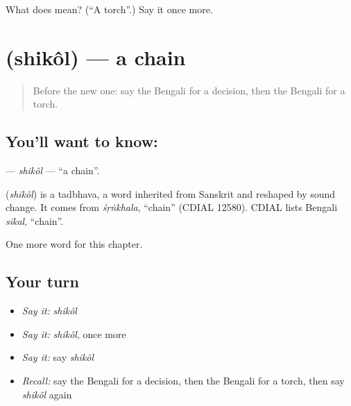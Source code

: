\begin{tcolorbox}[breakable,colback=teal!4,colframe=teal!35!black,title={Before you move on}]
What does  mean? (\textquotedblleft{}A torch\textquotedblright{}.) Say it once more.
\end{tcolorbox}
\section[\texorpdfstring{\bn{শিকল} (shikôl)}{শিকল (shikôl)}]{ (shikôl) — a chain}

\label{lesson:BN-C229-shikol}



\begin{quote}
Before the new one: say the Bengali for a decision, then the Bengali for a torch.
\end{quote}

\subsection*{You'll want to know: }
\textbf{} — \emph{shikôl} — \textquotedblleft{}a chain\textquotedblright{}.

\begin{cousinweb}
\textbf{} (\emph{shikôl}) is a tadbhava, a word inherited from Sanskrit and reshaped by sound change. It comes from \emph{śṛṅkhala}, \textquotedblleft{}chain\textquotedblright{} (CDIAL 12580). CDIAL lists Bengali \emph{sikal}, \textquotedblleft{}chain\textquotedblright{}.
\end{cousinweb}

\begin{grammarlens}[title={What you've built}]
One more word for this chapter.
\end{grammarlens}

\subsection*{Your turn}
\begin{itemize}
\raggedright
  \item \emph{Say it:} \emph{shikôl}
  \item \emph{Say it:} \emph{shikôl}, once more
  \item \emph{Say it:} say \emph{shikôl}
  \item \emph{Recall:} say the Bengali for a decision, then the Bengali for a torch, then say \emph{shikôl} again
\end{itemize}

